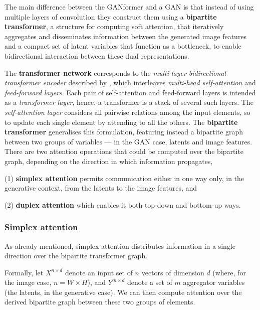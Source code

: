 \documentclass{article}
\begin{document}
	The main difference between the GANformer and a GAN is that instead of using multiple layers of 
	convolution they construct them using a \textbf{bipartite transformer}, a structure for computing 
	soft attention, that iteratively aggregates and disseminates information between the generated 
	image features and a compact set of latent variables that function as a bottleneck, to enable 
	bidirectional interaction between these dual representations. 
	
	The \textbf{transformer network} corresponds to the \textit{multi-layer bidirectional transformer 
	encoder} described by \citet{devlin2019bert}, which interleaves \textit{multi-head self-attention} and 
	\textit{feed-forward layers}.
	Each pair of self-attention and feed-forward layers is intended as a \textit{transformer layer}, hence, 
	a transformer is a stack of several such layers. 
	The \textit{self-attention layer} considers all pairwise relations among the input elements, so to 
	update each single element by attending to all the others. 
	The \textbf{bipartite transformer} generalises this formulation, featuring instead a bipartite graph 
	between two groups of variables — in the GAN case, latents and image features. 
	There are two attention operations that could be computed over the bipartite graph, depending on 
	the direction in which information propagates, 
	\begin{enumerate*}
		\item [(1)] \textbf{simplex attention} permits communication either in one way only, in the 
		generative context, from the latents to the image features, and
		\item [(2)] \textbf{duplex attention} which enables it both top-down and bottom-up ways.
	\end{enumerate*}
	
	\subsubsection{Simplex attention}%
	As already mentioned, simplex attention distributes information in a single direction over the 
	bipartite transformer graph. 
	
	Formally, let $X^{n\times d}$ denote an input set of $n$ vectors of dimension $d$ (where, for the 
	image case, $n = W\times H$), and $Y^{m\times d}$ denote a set of $m$ aggregator variables (the 
	latents, in the generative case). We can then compute attention over the derived bipartite graph 
	between these two groups of elements. 
	
\end{document}
